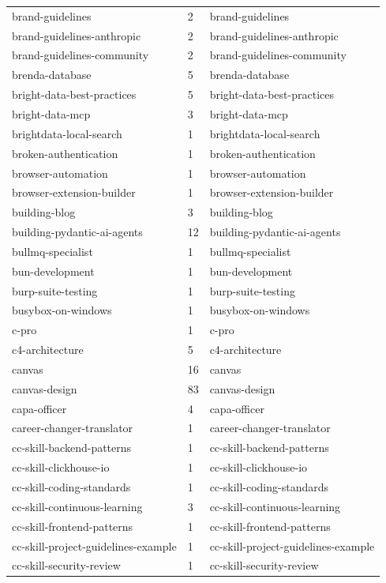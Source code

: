 \begin{longtable}{@{}lll@{}}
brand-guidelines & 2 & brand-guidelines\\
brand-guidelines-anthropic & 2 & brand-guidelines-anthropic\\
brand-guidelines-community & 2 & brand-guidelines-community\\
brenda-database & 5 & brenda-database\\
bright-data-best-practices & 5 & bright-data-best-practices\\
bright-data-mcp & 3 & bright-data-mcp\\
brightdata-local-search & 1 & brightdata-local-search\\
broken-authentication & 1 & broken-authentication\\
browser-automation & 1 & browser-automation\\
browser-extension-builder & 1 & browser-extension-builder\\
building-blog & 3 & building-blog\\
building-pydantic-ai-agents & 12 & building-pydantic-ai-agents\\
bullmq-specialist & 1 & bullmq-specialist\\
bun-development & 1 & bun-development\\
burp-suite-testing & 1 & burp-suite-testing\\
busybox-on-windows & 1 & busybox-on-windows\\
c-pro & 1 & c-pro\\
c4-architecture & 5 & c4-architecture\\
canvas & 16 & canvas\\
canvas-design & 83 & canvas-design\\
capa-officer & 4 & capa-officer\\
career-changer-translator & 1 & career-changer-translator\\
cc-skill-backend-patterns & 1 & cc-skill-backend-patterns\\
cc-skill-clickhouse-io & 1 & cc-skill-clickhouse-io\\
cc-skill-coding-standards & 1 & cc-skill-coding-standards\\
cc-skill-continuous-learning & 3 & cc-skill-continuous-learning\\
cc-skill-frontend-patterns & 1 & cc-skill-frontend-patterns\\
cc-skill-project-guidelines-example & 1 & cc-skill-project-guidelines-example\\
cc-skill-security-review & 1 & cc-skill-security-review\\

\end{longtable}
